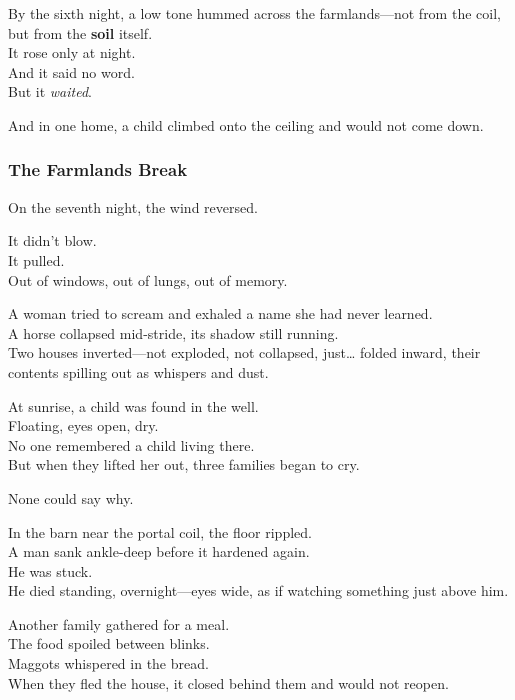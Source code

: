 \documentclass[12pt]{article}
\begin{document}
\vspace{0.5em}
By the sixth night, a low tone hummed across the farmlands---not from the coil, but from the \textbf{soil} itself.\\
It rose only at night.\\
And it said no word.\\
But it \textit{waited}.

\vspace{0.5em}
And in one home, a child climbed onto the ceiling and would not come down.

\dotfill

\subsubsection*{The Farmlands Break}

On the seventh night, the wind reversed.

\vspace{0.5em}
It didn’t blow.\\
It pulled.\\
Out of windows, out of lungs, out of memory.

\vspace{0.5em}
A woman tried to scream and exhaled a name she had never learned.\\
A horse collapsed mid-stride, its shadow still running.\\
Two houses inverted---not exploded, not collapsed, just\ldots{} folded inward, their contents spilling out as whispers and dust.

\vspace{0.5em}
At sunrise, a child was found in the well.\\
Floating, eyes open, dry.\\
No one remembered a child living there.\\
But when they lifted her out, three families began to cry.

\vspace{0.5em}
None could say why.

\vspace{0.5em}
In the barn near the portal coil, the floor rippled.\\
A man sank ankle-deep before it hardened again.\\
He was stuck.\\
He died standing, overnight---eyes wide, as if watching something just above him.

\vspace{0.5em}
Another family gathered for a meal.\\
The food spoiled between blinks.\\
Maggots whispered in the bread.\\
When they fled the house, it closed behind them and would not reopen.
\end{document}
